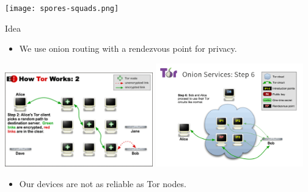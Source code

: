 \begin{frame}

  \begin{center}
    \texttt{[image: spores-squads.png]}
  \end{center}
\end{frame}

\begin{frame}
  \begin{block}{Idea}
    \begin{itemize}
      \item We use onion routing with a rendezvous point for privacy.
    \end{itemize}
  \end{block}

  \includegraphics[width=0.48\textwidth]{fig/tor.png}
  \hfill
  \includegraphics[width=0.48\textwidth]{fig/tor-hs.png}

  \pause

  \begin{remark}
    \begin{itemize}
      \item Our devices are not as reliable as Tor nodes.
    \end{itemize}
  \end{remark}
\end{frame}

